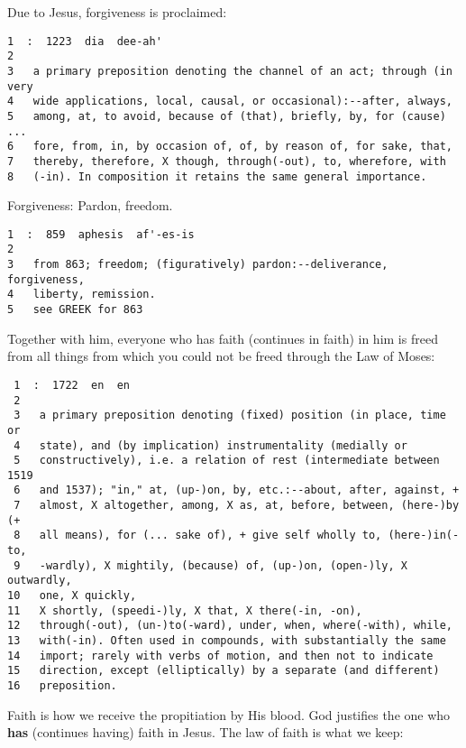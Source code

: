 \documentclass[11pt]{article}
\begin{document}
Due to Jesus, forgiveness is proclaimed:

\begin{verbatim}
1  :  1223  dia  dee-ah'
2  
3   a primary preposition denoting the channel of an act; through (in very
4   wide applications, local, causal, or occasional):--after, always,
5   among, at, to avoid, because of (that), briefly, by, for (cause) ...
6   fore, from, in, by occasion of, of, by reason of, for sake, that,
7   thereby, therefore, X though, through(-out), to, wherefore, with
8   (-in). In composition it retains the same general importance.
\end{verbatim}

Forgiveness: Pardon, freedom.

\begin{verbatim}
1  :  859  aphesis  af'-es-is
2  
3   from 863; freedom; (figuratively) pardon:--deliverance, forgiveness,
4   liberty, remission.
5   see GREEK for 863
\end{verbatim}

Together with him, everyone who has faith (continues in faith) in him is freed from all things from which you could not be freed through the Law of Moses:

\begin{verbatim}
 1  :  1722  en  en
 2  
 3   a primary preposition denoting (fixed) position (in place, time or
 4   state), and (by implication) instrumentality (medially or
 5   constructively), i.e. a relation of rest (intermediate between 1519
 6   and 1537); "in," at, (up-)on, by, etc.:--about, after, against, +
 7   almost, X altogether, among, X as, at, before, between, (here-)by (+
 8   all means), for (... sake of), + give self wholly to, (here-)in(-to,
 9   -wardly), X mightily, (because) of, (up-)on, (open-)ly, X outwardly,
10   one, X quickly,
11   X shortly, (speedi-)ly, X that, X there(-in, -on),
12   through(-out), (un-)to(-ward), under, when, where(-with), while,
13   with(-in). Often used in compounds, with substantially the same
14   import; rarely with verbs of motion, and then not to indicate
15   direction, except (elliptically) by a separate (and different)
16   preposition.
\end{verbatim}

Faith is how we receive the propitiation by His blood. God justifies the one who \textbf{has} (continues having) faith in Jesus. The law of faith is what we keep:
\end{document}
